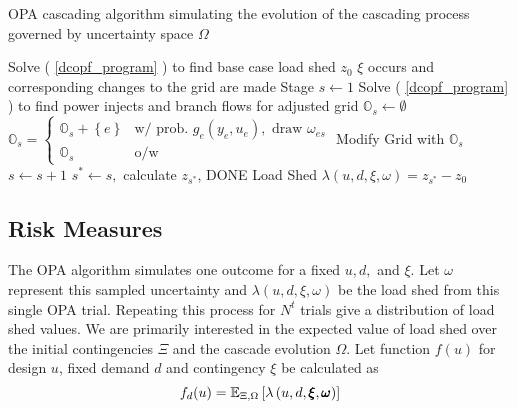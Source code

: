 \begin{algorithm}
\caption[OPA cascading algorithm simulating the evolution of the cascading process]{OPA cascading algorithm simulating the evolution of the cascading process governed by uncertainty space $\Omega$}\label{opa_alg}
\begin{algorithmic}
\State Solve ( \ref{dcopf_program} ) to find base case load shed $z_0$
\State $\xi$ occurs and corresponding changes to the grid are made
\State Stage $s \gets 1$
\State Solve ( \ref{dcopf_program} ) to find power injects and branch flows for adjusted grid
\State $\mathbb{O}_s \gets \emptyset$
\State $\mathbb{O}_s = 
\left\{ 
\begin{array}{lr}
  \mathbb{O}_s + \left\{ e \right\} & \mbox{w/ prob. } g_e(y_e,u_e), \mbox{ draw } \omega_{es} \\
  \mathbb{O}_s & \mbox{o/w }
\end{array}
\right. $ 
\EndFor
{}
\State Modify Grid with $\mathbb{O}_s$
\State $s\gets s+1$
\Else
\State $s^* \gets s,$ calculate $z_{s^*}$, DONE
\EndIf
\EndWhile
\State \label{done}Load Shed $  \lambda\left(u,d,\xi,\omega\right)  = z_{s^*} - z_0$
\EndProcedure
\end{algorithmic}
\end{algorithm}

\subsection{Risk Measures}\label{riskmeasures}
The OPA algorithm simulates one outcome for a fixed $u, d,$ and $\xi$.  Let $\omega$ represent this sampled uncertainty and $\lambda\left(u,d,\xi,\omega\right)$ be the load shed from this single OPA trial.  Repeating this process for $N^t$ trials give a distribution of load shed values.  We are primarily interested in the expected value of load shed over the initial contingencies $\Xi$ and the cascade evolution $\Omega$.  Let function $f (u) $  for design $u$, fixed demand $d$ and contingency $\xi$ be calculated as 
\begin{equation}
f_d(u) = \mathbb{E}_{\Xi,\Omega} \left[  \lambda\left(u,d,\pmb{\xi},\pmb{\omega}\right)  \right]
\end{equation}

